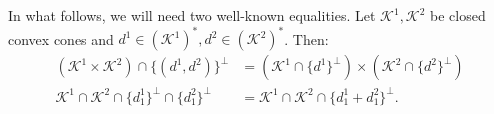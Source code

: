 \documentclass{article}
\newcommand{\closure}{\mathrm{cl}\,}
\newcommand{\inProd}[2]{\langle #1 , #2 \rangle }
\newcommand{\stdMap}{ {\mathcal{A}}}
\newcommand{\stdCone}{ {\mathcal{K}}}
\begin{document}
%
In what follows, we will need two well-known equalities. 
Let $\stdCone ^1, \stdCone ^2$ be closed convex cones and 
$d^1 \in (\stdCone^1)^*, d^2\in (\stdCone ^2)^*$. Then:
\begin{align}
(\stdCone^1 \times \stdCone^2)\cap \{(d^1,d^2) \}^\perp & = \left({\stdCone^1} \cap \{d^1\}^\perp\right) \times \left({\stdCone^2}\cap\{d^2\}^\perp\right) \label{eq:lem1}\\
{\stdCone^1} \cap {\stdCone^2}\cap \{d_1^1\}^\perp \cap \{d_1^2 \}^\perp  & =   {\stdCone^1} \cap {\stdCone^2}\cap \{d_1^1 +d_1^2 \}^\perp. \label{eq:lem2}
\end{align}
\end{document}

